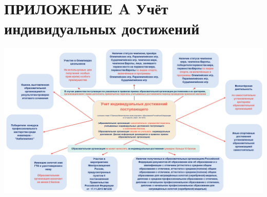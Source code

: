 \section*{ПРИЛОЖЕНИЕ A Учёт индивидуальных достижений}

 \mbox{} \begin{center}
    \begin{sideways}%
         \begin{minipage}{1.2\linewidth}
                    \includegraphics[width=\linewidth,keepaspectratio]{img/achiv.png}
         \vspace{0.2cm}
         \label{achiv}
         \end{minipage}
    \end{sideways}
    \end{center}
